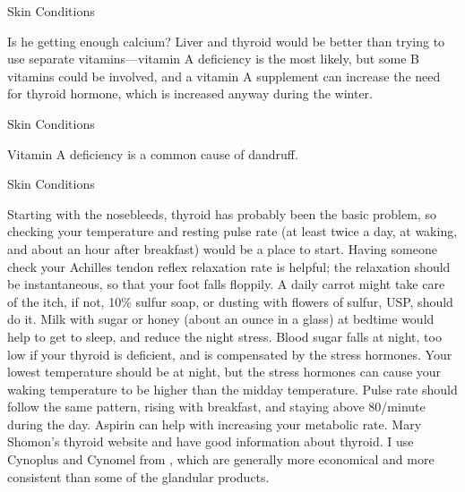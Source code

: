 \documentclass[11pt,oneside,openany,extrafontsizes]{memoir}
\begin{document}
\begin{standalonequote}{Skin Conditions}

    \begin{answer}
        Is he getting enough calcium? Liver and thyroid would be better than trying to use separate vitamins---vitamin A deficiency is the most likely, but some B vitamins could be involved, and a vitamin A supplement can increase the need for thyroid hormone, which is increased anyway during the winter.
    \end{answer}
\end{standalonequote}

\begin{standalonequote}{Skin Conditions}

    \begin{answer}
        Vitamin A deficiency is a common cause of dandruff.
    \end{answer}
\end{standalonequote}

\begin{standalonequote}{Skin Conditions}

    \begin{answer}
         Starting with the nosebleeds, thyroid has probably been the basic problem, so checking your temperature and resting pulse rate (at least twice a day, at waking, and about an hour after breakfast) would be a place to start. Having someone check your Achilles tendon reflex relaxation rate is helpful; the relaxation should be instantaneous, so that your foot falls floppily. A daily carrot might take care of the itch, if not, 10\% sulfur soap, or dusting with flowers of sulfur, USP, should do it. Milk with sugar or honey (about an ounce in a glass) at bedtime would help to get to sleep, and reduce the night stress. Blood sugar falls at night, too low if your thyroid is deficient, and is compensated by the stress hormones. Your lowest temperature should be at night, but the stress hormones can cause your waking temperature to be higher than the midday temperature. Pulse rate should follow the same pattern, rising with breakfast, and staying above 80/minute during the day. Aspirin can help with increasing your metabolic rate. Mary Shomon's thyroid website and  have good information about thyroid. I use Cynoplus and Cynomel from , which are generally more economical and more consistent than some of the glandular products.
    \end{answer}
\end{standalonequote}
\end{document}
